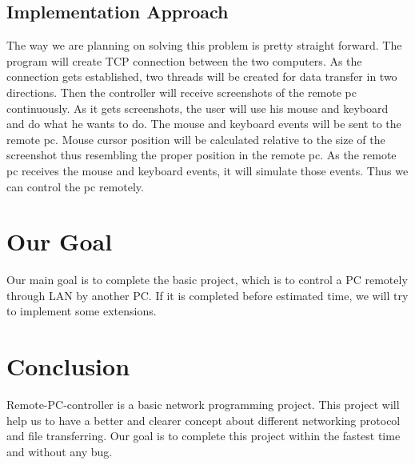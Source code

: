 \documentclass[12pt, a4paper]{article}
\begin{document}
\subsection{Implementation Approach}
The way we are planning on solving this problem is pretty straight forward. The program will create TCP connection between the two computers. As the connection gets established, two threads will be created for data transfer in two directions. Then the controller will receive screenshots of the remote pc continuously. As it gets screenshots, the user will use his mouse and keyboard and do what he wants to do. The mouse and keyboard events will be sent to the remote pc. Mouse cursor position will be calculated relative to the size of the screenshot thus resembling the proper position in the remote pc. As the remote pc receives the mouse and keyboard events, it will simulate those events. Thus we can control the pc remotely.

\newpage

\section{Our Goal}
Our main goal is to complete the basic project, which is to control a PC remotely through LAN by another PC. If it is completed before estimated time, we will try to implement some extensions.


\section{Conclusion}
Remote-PC-controller is a basic network programming project. This project will help us to have a better and clearer concept about different networking protocol and file transferring. Our goal is to complete this project within the fastest time and without any bug.
\end{document}
